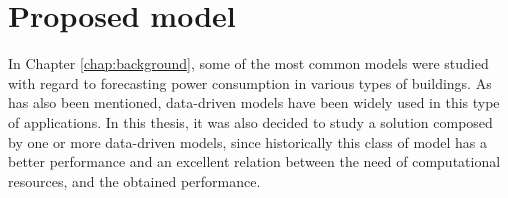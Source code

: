 



\section{Proposed model}\label{chap3:sec:proposed_model}

In Chapter \ref{chap:background}, some of the most common models were studied with regard to forecasting power consumption in various types of buildings. As has also been mentioned, data-driven models have been widely used in this type of applications. In this thesis, it was also decided to study a solution composed by one or more data-driven models, since historically this class of model has a better performance and an excellent relation between the need of computational resources, and the obtained performance.

